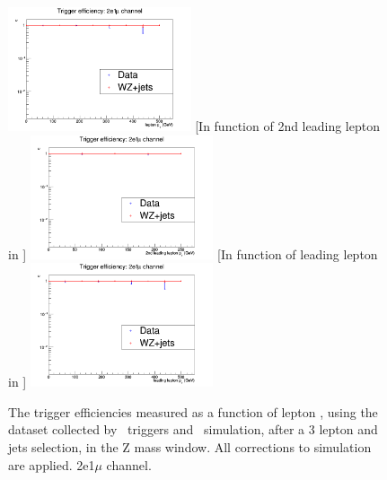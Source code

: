 \begin{figure}[tb]
	[In function of lepton \pt]{
		\includegraphics[width=0.48\textwidth]{Appendix/Figures/trigger/Triggereff/2e1mu/triggeff_2e1muhistPt.png}
		\label{image:triggeff_2e1muhistPt.png}
	}
	[In function of 2nd leading lepton in \pt]{
		\includegraphics[width=0.48\textwidth]{Appendix/Figures/trigger/Triggereff/2e1mu/triggeff_2e1muhistPt_2ndleadinglep.png}
		\label{image:triggeff_2e1muhistPt_2ndleadinglep.png}
	}
	[In function of leading lepton in \pt]{
		\includegraphics[width=0.48\textwidth]{Appendix/Figures/trigger/Triggereff/2e1mu/triggeff_2e1muhistPt_leadinglep.png}
		\label{image:triggeff_2e1muhistPt_leadinglep.png}
	}
	\caption{The trigger efficiencies measured as a function of lepton \pt, using the dataset collected by \Etmis\ triggers and \WZ\ simulation, after a 3 lepton and jets selection, in the Z mass window. All corrections to simulation are applied. 2e1$\mu$ channel.}
	\label{image:FigurestriggerTriggereff2e1mu}
\end{figure}


